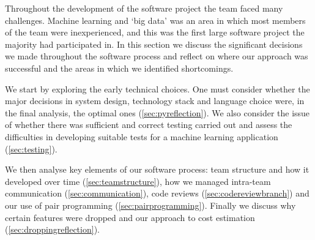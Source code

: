 \documentclass{l3proj}
\begin{document}
%
% 
%
%

Throughout the development of the software project the team faced many challenges. Machine learning and ‘big data’ was an area in which most members of the team were inexperienced, and this was the first large software project the majority had participated in. In this section we discuss the significant decisions we made throughout the software process and reflect on where our approach was successful and the areas in which we identified shortcomings. 

We start by exploring the early technical choices. One must consider whether the major decisions in system design, technology stack and language choice were, in the final analysis, the optimal ones (\ref{sec:pyreflection}). We also consider the issue of whether there was sufficient and correct testing carried out and assess the difficulties in developing suitable tests for a machine learning application (\ref{sec:testing}).

We then analyse key elements of our software process: team structure and how it developed over time (\ref{sec:teamstructure}), how we managed intra-team communication  (\ref{sec:communication}), code reviews (\ref{sec:codereviewbranch}) and our use of pair programming (\ref{sec:pairprogramming}). Finally we discuss why certain features were dropped and our approach to cost estimation (\ref{sec:droppingreflection}).
\end{document}
